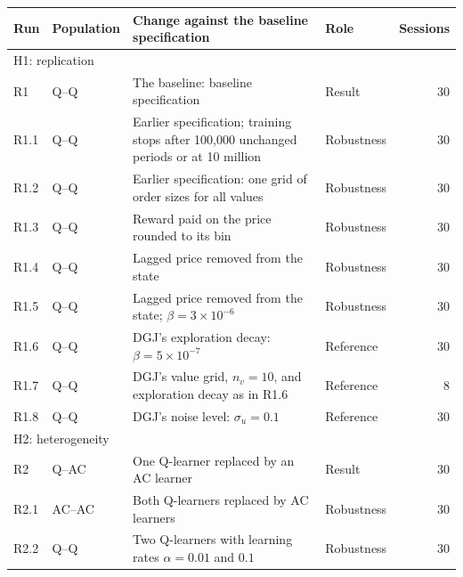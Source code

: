\begin{tabular}{llp{8.6cm}lr}
\toprule
Run & Population & Change against the baseline specification & Role & Sessions \\
\midrule
\multicolumn{5}{l}{H1: replication} \\
R1 & Q–Q & The baseline: baseline specification & Result & 30 \\
R1.1 & Q–Q & Earlier specification; training stops after 100,000 unchanged periods or at 10 million & Robustness & 30 \\
R1.2 & Q–Q & Earlier specification: one grid of order sizes for all values & Robustness & 30 \\
R1.3 & Q–Q & Reward paid on the price rounded to its bin & Robustness & 30 \\
R1.4 & Q–Q & Lagged price removed from the state & Robustness & 30 \\
R1.5 & Q–Q & Lagged price removed from the state; $\beta = 3\times10^{-6}$ & Robustness & 30 \\
R1.6 & Q–Q & DGJ's exploration decay: $\beta = 5\times10^{-7}$ & Reference & 30 \\
R1.7 & Q–Q & DGJ's value grid, $n_v = 10$, and exploration decay as in R1.6 & Reference & 8 \\
R1.8 & Q–Q & DGJ's noise level: $\sigma_u = 0.1$ & Reference & 30 \\
\midrule
\multicolumn{5}{l}{H2: heterogeneity} \\
R2 & Q–AC & One Q-learner replaced by an AC learner & Result & 30 \\
R2.1 & AC–AC & Both Q-learners replaced by AC learners & Robustness & 30 \\
R2.2 & Q–Q & Two Q-learners with learning rates $\alpha = 0.01$ and $0.1$ & Robustness & 30 \\
\bottomrule
\end{tabular}
